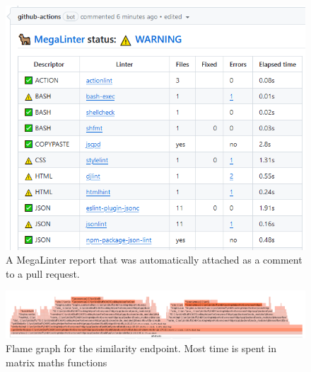 \begin{figure}[ht]
  \centering
  \caption{\label{fig:metalinter_report}A MegaLinter report that was automatically attached as a comment to a pull request.}
  \includegraphics[width=\textwidth]{figures/megalinter_report.png}
\end{figure}

\begin{figure}
  \centering
  \caption{\label{fig:similarity_flamegraph}Flame graph for the similarity endpoint. Most time is spent in matrix maths functions}
  \includegraphics[angle=90,height=0.9\textheight]{figures/similarity_flamegraph.png}
\end{figure}

